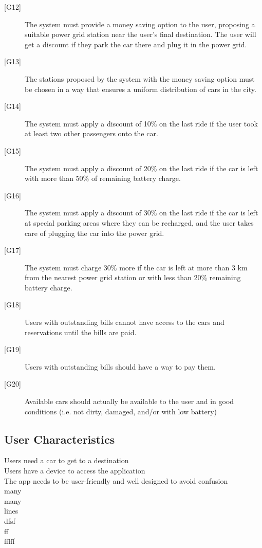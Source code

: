 \documentclass[english]{article}
\begin{document}
\begin{description}
	\item[{[G12]}]{The system must provide a money saving option to the user, proposing a suitable power grid station near the user’s final destination. The user will get a discount if they park the car there and plug it in the power grid.}
	\item[{[G13]}]{The stations proposed by the system with the money saving option must be chosen in a way that ensures a uniform distribution of cars in the city.}
	\item[{[G14]}]{The system must apply a discount of 10\% on the last ride if the user took at least two other passengers onto the car.}
	\item[{[G15]}]{The system must apply a discount of 20\% on the last ride if the car is left with more than 50\% of remaining battery charge.}
	\item[{[G16]}]{The system must apply a discount of 30\% on the last ride if the car is left at special parking areas where they can be recharged, and the user takes care of plugging the car into the power grid.}
	\item[{[G17]}]{The system must charge 30\% more if the car is left at more than 3 km from the nearest power grid station or with less than 20\% remaining battery charge.}
	\item[{[G18]}]{Users with outstanding bills cannot have access to the cars and reservations until the bills are paid.}
	\item[{[G19]}]{Users with outstanding bills should have a way to pay them.}
	\item[{[G20]}]{Available cars should actually be available to the user and in good conditions (i.e. not dirty, damaged, and/or with low battery)}
\end{description}

\subsection{User Characteristics}

Users need a car to get to a destination\\
Users have a device to access the application\\
The app needs to be user-friendly and well designed to avoid confusion\\
many\\
many\\
lines\\
dfsf\\
ff\\
fffff\\
\end{document}
